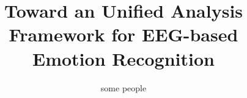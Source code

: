 \documentclass{sig-alternate}
\begin{document}
%

\title{Toward an Unified Analysis Framework for EEG-based Emotion Recognition}

%
%
%
%
%

%
\author{
%
%
\alignauthor
some people
}
\end{document}
